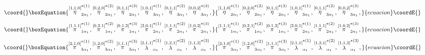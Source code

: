 \documentclass[a4paper,12pt]{article}
\begin{document}
\begin{equation}\coord{}\boxEquation{
\stackrel{\left[ 1,1,0\right] }{\eta }_{2\alpha _{1}}^{*(1)},\stackrel{
\left[ 0,2,0\right] }{\eta }_{2\alpha _{1}}^{*(2)},\stackrel{\left[
0,1,1\right] }{\eta }_{2\alpha _{1}}^{*(3)},\stackrel{\left[ 1,0,1\right] }{
\eta }_{3\alpha _{1}}^{*(1)},\stackrel{\left[ 0,1,1\right] }{\eta }_{3\alpha
_{1}}^{*(2)},\stackrel{\left[ 0,0,2\right] }{\eta }_{3\alpha _{1}}^{*(3)},
\label{sp3.27}
}{
\stackrel{\left[ 1,1,0\right] }{\eta }_{2\alpha _{1}}^{*(1)},\stackrel{
\left[ 0,2,0\right] }{\eta }_{2\alpha _{1}}^{*(2)},\stackrel{\left[
0,1,1\right] }{\eta }_{2\alpha _{1}}^{*(3)},\stackrel{\left[ 1,0,1\right] }{
\eta }_{3\alpha _{1}}^{*(1)},\stackrel{\left[ 0,1,1\right] }{\eta }_{3\alpha
_{1}}^{*(2)},\stackrel{\left[ 0,0,2\right] }{\eta }_{3\alpha _{1}}^{*(3)},
}{ecuacion}\coordE{}\end{equation}
\begin{equation}\coord{}\boxEquation{
\stackrel{\left[ 1,1,1\right] }{\pi }_{1\alpha _{1}}^{*(1)},\stackrel{\left[
0,2,1\right] }{\pi }_{1\alpha _{1}}^{*(2)},\stackrel{\left[ 0,1,2\right] }{
\pi }_{1\alpha _{1}}^{*(3)},\stackrel{\left[ 2,0,1\right] }{\pi }_{2\alpha
_{1}}^{*(1)},\stackrel{\left[ 1,1,1\right] }{\pi }_{2\alpha _{1}}^{*(2)},
\stackrel{\left[ 1,0,2\right] }{\pi }_{2\alpha _{1}}^{*(3)},  \label{sp3.28}
}{
\stackrel{\left[ 1,1,1\right] }{\pi }_{1\alpha _{1}}^{*(1)},\stackrel{\left[
0,2,1\right] }{\pi }_{1\alpha _{1}}^{*(2)},\stackrel{\left[ 0,1,2\right] }{
\pi }_{1\alpha _{1}}^{*(3)},\stackrel{\left[ 2,0,1\right] }{\pi }_{2\alpha
_{1}}^{*(1)},\stackrel{\left[ 1,1,1\right] }{\pi }_{2\alpha _{1}}^{*(2)},
\stackrel{\left[ 1,0,2\right] }{\pi }_{2\alpha _{1}}^{*(3)},  }{ecuacion}\coordE{}\end{equation}
\begin{equation}\coord{}\boxEquation{
\stackrel{\left[ 2,1,0\right] }{\pi }_{3\alpha _{1}}^{*(1)},\stackrel{\left[
1,2,0\right] }{\pi }_{3\alpha _{1}}^{*(2)},\stackrel{\left[ 1,1,1\right] }{
\pi }_{3\alpha _{1}}^{*(3)},\stackrel{\left[ 2,1,1\right] }{\lambda }
_{\alpha _{1}}^{*(1)},\stackrel{\left[ 1,2,1\right] }{\lambda }_{\alpha
_{1}}^{*(2)},\stackrel{\left[ 1,1,2\right] }{\lambda }_{\alpha _{1}}^{*(3)},
\label{sp3.29}
}{
\stackrel{\left[ 2,1,0\right] }{\pi }_{3\alpha _{1}}^{*(1)},\stackrel{\left[
1,2,0\right] }{\pi }_{3\alpha _{1}}^{*(2)},\stackrel{\left[ 1,1,1\right] }{
\pi }_{3\alpha _{1}}^{*(3)},\stackrel{\left[ 2,1,1\right] }{\lambda }
_{\alpha _{1}}^{*(1)},\stackrel{\left[ 1,2,1\right] }{\lambda }_{\alpha
_{1}}^{*(2)},\stackrel{\left[ 1,1,2\right] }{\lambda }_{\alpha _{1}}^{*(3)},
}{ecuacion}\coordE{}\end{equation}
\end{document}
